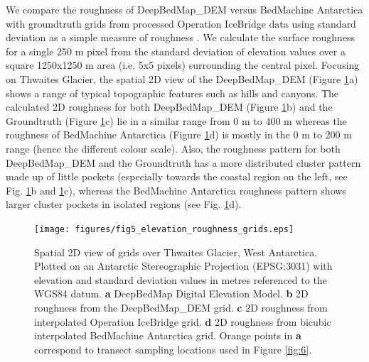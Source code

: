 \documentclass[tc, manuscript]{copernicus}
\begin{document}
We compare the roughness of DeepBedMap\_DEM versus BedMachine Antarctica with groundtruth grids from processed Operation IceBridge data \citep{ShiMultichannelCoherentRadar2010} using standard deviation as a simple measure of roughness \citep{RippinBasalroughnessInstitute2014}.
We calculate the surface roughness for a single 250 m pixel from the standard deviation of elevation values over a square 1250x1250 m area (i.e. 5x5 pixels) surrounding the central pixel.
Focusing on Thwaites Glacier, the spatial 2D view of the DeepBedMap\_DEM (Figure \ref{fig:5}a) shows a range of typical topographic features such as hills and canyons.
The calculated 2D roughness for both DeepBedMap\_DEM (Figure \ref{fig:5}b) and the Groundtruth (Figure \ref{fig:5}c) lie in a similar range from 0 m to 400 m whereas the roughness of BedMachine Antarctica (Figure \ref{fig:5}d) is mostly in the 0 m to 200 m range (hence the different colour scale).
Also, the roughness pattern for both DeepBedMap\_DEM and the Groundtruth has a more distributed cluster pattern made up of little pockets (especially towards the coastal region on the left, see Fig. \ref{fig:5}b and \ref{fig:5}c), whereas the BedMachine Antarctica roughness pattern shows larger cluster pockets in isolated regions (see Fig. \ref{fig:5}d).

\begin{figure}[htbp]
  \texttt{[image: figures/fig5\_elevation\_roughness\_grids.eps]}
  \caption{
    Spatial 2D view of grids over Thwaites Glacier, West Antarctica.
    Plotted on an Antarctic Stereographic Projection (EPSG:3031) with elevation and standard deviation values in metres referenced to the WGS84 datum.
    \textbf{a} DeepBedMap Digital Elevation Model.
    \textbf{b} 2D roughness from the DeepBedMap\_DEM grid.
    \textbf{c} 2D roughness from interpolated Operation IceBridge grid.
    \textbf{d} 2D roughness from bicubic interpolated BedMachine Antarctica grid.
    Orange points in \textbf{a} correspond to transect sampling locations used in Figure \ref{fig:6}.
  }
  \label{fig:5}
\end{figure}
\end{document}
